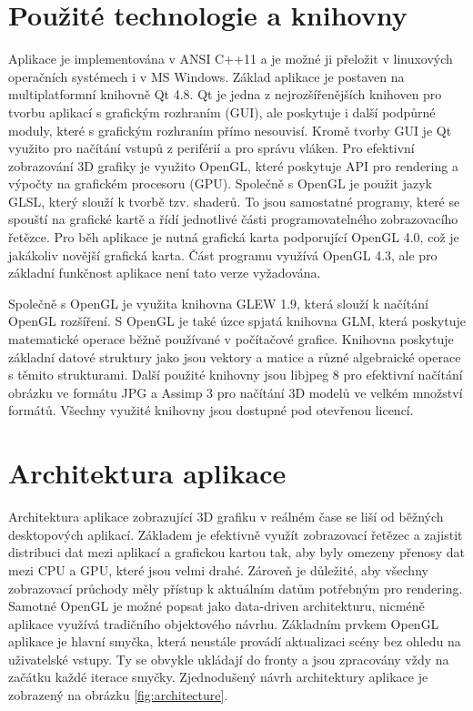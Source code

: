 \documentclass[11pt,twoside,a4paper]{book}
\begin{document}
\section{Použité technologie a knihovny}
Aplikace je implementována v ANSI C++11 a je možné ji přeložit v linuxových operačních systémech i v MS Windows. Základ aplikace je postaven na multiplatformní knihovně Qt 4.8. Qt je jedna z nejrozšířenějších knihoven pro tvorbu aplikací s grafickým rozhraním (GUI), ale poskytuje i další podpůrné moduly, které s grafickým rozhraním přímo nesouvisí. Kromě tvorby GUI je Qt využito pro načítání vstupů z periférií a pro správu vláken. Pro efektivní zobrazování 3D grafiky je využito OpenGL, které poskytuje API pro rendering a výpočty na grafickém procesoru (GPU). Společně s OpenGL je použit jazyk GLSL, který slouží k tvorbě tzv. shaderů. To jsou samostatné programy, které se spouští na grafické kartě a řídí jednotlivé části programovatelného zobrazovacího řetězce. Pro běh aplikace je nutná grafická karta podporující OpenGL 4.0, což je jakákoliv novější grafická karta. Část programu využívá OpenGL 4.3, ale pro základní funkčnost aplikace není tato verze vyžadována. 

Společně s OpenGL je využita knihovna GLEW 1.9, která slouží k načítání OpenGL rozšíření. S OpenGL je také úzce spjatá knihovna GLM, která poskytuje matematické operace běžně používané v počítačové grafice. Knihovna poskytuje základní datové struktury jako jsou vektory a matice a různé algebraické operace s těmito strukturami. Další použité knihovny jsou libjpeg 8 pro efektivní načítání obrázku ve formátu JPG a Assimp 3 pro načítání 3D modelů ve velkém množství formátů. Všechny využité knihovny jsou dostupné pod otevřenou licencí.

\section{Architektura aplikace}

Architektura aplikace zobrazující 3D grafiku v reálném čase se liší od běžných desktopových aplikací. Základem je efektivně využít zobrazovací řetězec a zajistit distribuci dat mezi aplikací a grafickou kartou tak, aby byly omezeny přenosy dat mezi CPU a GPU, které jsou velmi drahé. Zároveň je důležité, aby všechny zobrazovací průchody měly přístup k aktuálním datům potřebným pro rendering. Samotné OpenGL je možné popsat jako data-driven architekturu, nicméně aplikace využívá tradičního objektového návrhu. Základním prvkem OpenGL aplikace je hlavní smyčka, která neustále provádí aktualizaci scény bez ohledu na uživatelské vstupy. Ty se obvykle ukládají do fronty a jsou zpracovány vždy na začátku každé iterace smyčky. Zjednodušený návrh architektury aplikace je zobrazený na obrázku \ref{fig:architecture}.
\end{document}
